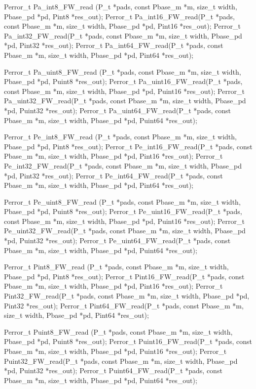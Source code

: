 \begin{tinycodeaux}{\leftmargin=0in}
Perror_t Pa_int8_FW_read (P_t *pads, const Pbase_m *m, size_t width,
			  Pbase_pd *pd, Pint8 *res_out);
Perror_t Pa_int16_FW_read(P_t *pads, const Pbase_m *m, size_t width,
			  Pbase_pd *pd, Pint16 *res_out);
Perror_t Pa_int32_FW_read(P_t *pads, const Pbase_m *m, size_t width,
			  Pbase_pd *pd, Pint32 *res_out);
Perror_t Pa_int64_FW_read(P_t *pads, const Pbase_m *m, size_t width,
			  Pbase_pd *pd, Pint64 *res_out);

Perror_t Pa_uint8_FW_read (P_t *pads, const Pbase_m *m, size_t width,
			   Pbase_pd *pd, Puint8 *res_out);
Perror_t Pa_uint16_FW_read(P_t *pads, const Pbase_m *m, size_t width,
			   Pbase_pd *pd, Puint16 *res_out);
Perror_t Pa_uint32_FW_read(P_t *pads, const Pbase_m *m, size_t width,
			   Pbase_pd *pd, Puint32 *res_out);
Perror_t Pa_uint64_FW_read(P_t *pads, const Pbase_m *m, size_t width,
			   Pbase_pd *pd, Puint64 *res_out);

Perror_t Pe_int8_FW_read (P_t *pads, const Pbase_m *m, size_t width,
			  Pbase_pd *pd, Pint8 *res_out);
Perror_t Pe_int16_FW_read(P_t *pads, const Pbase_m *m, size_t width,
			  Pbase_pd *pd, Pint16 *res_out);
Perror_t Pe_int32_FW_read(P_t *pads, const Pbase_m *m, size_t width,
			  Pbase_pd *pd, Pint32 *res_out);
Perror_t Pe_int64_FW_read(P_t *pads, const Pbase_m *m, size_t width,
			  Pbase_pd *pd, Pint64 *res_out);

Perror_t Pe_uint8_FW_read (P_t *pads, const Pbase_m *m, size_t width,
			   Pbase_pd *pd, Puint8 *res_out);
Perror_t Pe_uint16_FW_read(P_t *pads, const Pbase_m *m, size_t width,
			   Pbase_pd *pd, Puint16 *res_out);
Perror_t Pe_uint32_FW_read(P_t *pads, const Pbase_m *m, size_t width,
			   Pbase_pd *pd, Puint32 *res_out);
Perror_t Pe_uint64_FW_read(P_t *pads, const Pbase_m *m, size_t width,
			   Pbase_pd *pd, Puint64 *res_out);

Perror_t Pint8_FW_read (P_t *pads, const Pbase_m *m, size_t width,
			Pbase_pd *pd, Pint8 *res_out);
Perror_t Pint16_FW_read(P_t *pads, const Pbase_m *m, size_t width,
			Pbase_pd *pd, Pint16 *res_out);
Perror_t Pint32_FW_read(P_t *pads, const Pbase_m *m, size_t width,
			Pbase_pd *pd, Pint32 *res_out);
Perror_t Pint64_FW_read(P_t *pads, const Pbase_m *m, size_t width,
			Pbase_pd *pd, Pint64 *res_out);

Perror_t Puint8_FW_read (P_t *pads, const Pbase_m *m, size_t width,
			 Pbase_pd *pd, Puint8 *res_out);
Perror_t Puint16_FW_read(P_t *pads, const Pbase_m *m, size_t width,
			 Pbase_pd *pd, Puint16 *res_out);
Perror_t Puint32_FW_read(P_t *pads, const Pbase_m *m, size_t width,
			 Pbase_pd *pd, Puint32 *res_out);
Perror_t Puint64_FW_read(P_t *pads, const Pbase_m *m, size_t width,
			 Pbase_pd *pd, Puint64 *res_out);
\end{tinycodeaux}

